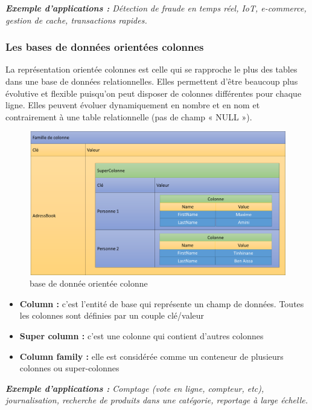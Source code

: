 \textit{\textbf{Exemple d'applications :} Détection de fraude en temps réel, IoT, e-commerce, gestion de cache, transactions rapides.}

\subsubsection{Les bases de données orientées colonnes}
La représentation orientée colonnes est celle qui se rapproche le plus des tables dans une base de données relationnelles. Elles permettent d'être beaucoup plus évolutive et flexible puisqu'on peut disposer de colonnes différentes pour chaque ligne. Elles peuvent évoluer dynamiquement en nombre et en nom et contrairement à une table relationnelle (pas de champ « NULL »).

\begin{figure}[h]
	\centering
    \includegraphics[scale=0.26]{img/4.4}
    \caption{base de donnée orientée colonne}
\end{figure}
\bigskip \bigskip \bigskip  \bigskip  \bigskip 
\begin{itemize}[label=\textbullet]
\item \textbf{Column :} c’est l’entité de base qui représente un champ de données. Toutes les colonnes sont définies par un couple clé/valeur
\item \textbf{Super column :} c’est une colonne qui contient d’autres colonnes
\item \textbf{Column family :} elle est considérée comme un conteneur de plusieurs colonnes ou super-colonnes
\end{itemize}

\textit{\textbf{Exemple d'applications :} Comptage (vote en ligne, compteur, etc), journalisation, recherche de produits dans une catégorie, reportage à large échelle.}

